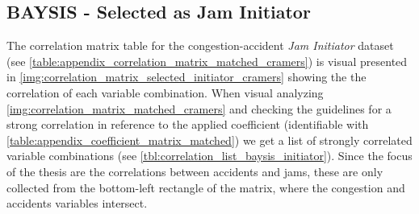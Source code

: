 \subsection{BAYSIS - Selected as Jam Initiator}
\label{analysis_processing_correlation_baysis_initiator}
The correlation matrix table for the congestion-accident \textit{Jam Initiator} dataset (see \cref{table:appendix_correlation_matrix_matched_cramers}) is visual presented in \cref{img:correlation_matrix_selected_initiator_cramers} showing the the correlation of each variable combination. When visual analyzing \cref{img:correlation_matrix_matched_cramers} and checking the guidelines for a strong correlation in reference to the applied coefficient (identifiable with \cref{table:appendix_coefficient_matrix_matched}) we get a list of strongly correlated variable combinations (see \cref{tbl:correlation_list_baysis_initiator}). Since the focus of the thesis are the correlations between accidents and jams, these are only collected from the bottom-left rectangle of the matrix, where the congestion and accidents variables intersect.

